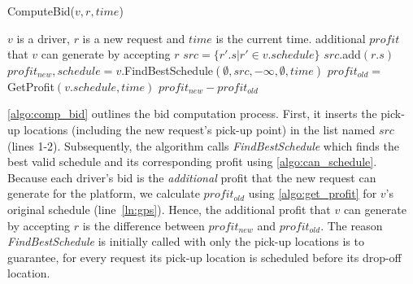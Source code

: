 %


\begin{algorithm}[!h]
	\caption{ComputeBid($v, r, time$)}
	\label{algo:comp_bid}
	\begin{algorithmic}[1]
		\REQUIRE $v$ is a driver, $r$ is a new request and $time$ is the current time.
		\ENSURE additional $profit$ that $v$ can generate by accepting $r$
		\STATE $src = \lbrace r'.s | r' \in v.schedule \rbrace$ 
		\STATE $src.$add$(r.s)$
		\STATE \small{$profit_{new}, schedule = v$.FindBestSchedule$(\emptyset, src, -\infty, \emptyset,  time)$} \label{ln:fbs}
		\STATE $profit_{old}= $GetProfit$(v.schedule, time)$ \label{ln:gps}
		\RETURN $profit_{new} - profit_{old}$
	\end{algorithmic}
\end{algorithm}\vspace{-1mm}

\cref{algo:comp_bid} outlines the bid computation process. First, it inserts the pick-up locations (including the new request's pick-up point) in the list named $src$ (lines 1-2). Subsequently, the algorithm calls \textit{FindBestSchedule} which finds the best valid schedule and its corresponding profit using \cref{algo:can_schedule}. Because each driver's bid is the \textit{additional} profit that the new request can generate for the platform, we calculate $profit_{old}$ using \cref{algo:get_profit} for $v$'s original schedule (line~\ref{ln:gps}). Hence, the additional profit that $v$ can generate by accepting $r$ is the difference between $profit_{new}$ and $profit_{old}$. The reason \textit{FindBestSchedule} is initially called with only the pick-up locations is to guarantee, for every request its pick-up location is scheduled before its drop-off location. 

